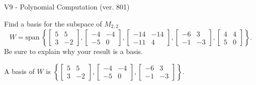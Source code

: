 \begin{exercise}
  \begin{exerciseTitle}V9 - Polynomial Computation (ver. 801)\end{exerciseTitle}
  \begin{exerciseStatement}
    Find a basis for the subspace of \(M_{2,2}\) 
\[W=\mathrm{span}\ \left\{\left[\begin{array}{cc}
5 & 5 \\
3 & -2
\end{array}\right] , \left[\begin{array}{cc}
-4 & -4 \\
-5 & 0
\end{array}\right] , \left[\begin{array}{cc}
-14 & -14 \\
-11 & 4
\end{array}\right] , \left[\begin{array}{cc}
-6 & 3 \\
-1 & -3
\end{array}\right] , \left[\begin{array}{cc}
4 & 4 \\
5 & 0
\end{array}\right]\right\}.\]
 Be sure to explain why your result is a basis.


  \end{exerciseStatement}
  \begin{exerciseAnswer}
   A basis of \(W\) is  \(\left\{\left[\begin{array}{cc}
5 & 5 \\
3 & -2
\end{array}\right] , \left[\begin{array}{cc}
-4 & -4 \\
-5 & 0
\end{array}\right] , \left[\begin{array}{cc}
-6 & 3 \\
-1 & -3
\end{array}\right]\right\}\).
  


  \end{exerciseAnswer}
\end{exercise}